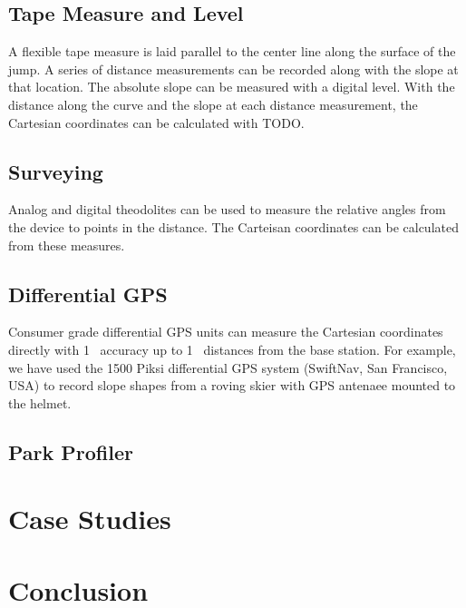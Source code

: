 \documentclass{article}
\begin{document}
\subsection{Tape Measure and Level}
%
A flexible tape measure is laid parallel to the center line along the surface of the jump. A series of distance measurements can be recorded along with the slope at that location. The absolute slope can be measured with a digital level. With the distance along the curve and the slope at each distance measurement, the Cartesian coordinates can be calculated with TODO.

\subsection{Surveying}
%
Analog and digital theodolites can be used to measure the relative angles from the device to points in the distance. The Carteisan coordinates can be calculated from these measures.

\subsection{Differential GPS}
%
Consumer grade differential GPS units can measure the Cartesian coordinates directly with 1~\SIunit{\centi\meter} accuracy up to 1~\SIunit{\kilo\meter} distances from the base station. For example, we have used the 1500 Piksi differential GPS system (SwiftNav, San Francisco, USA) to record slope shapes from a roving skier with GPS antenaee mounted to the helmet.

\subsection{Park Profiler}

\section{Case Studies}

\section{Conclusion}
\end{document}
